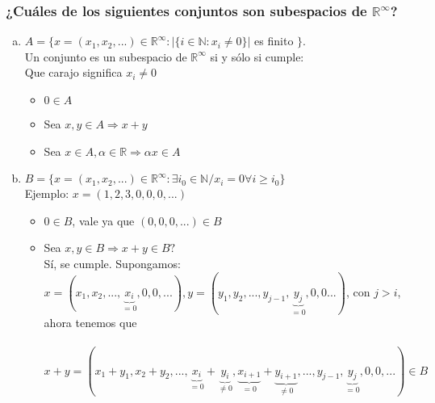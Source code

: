 \documentclass{article}
\begin{document}
\subsubsection{¿Cuáles de los siguientes conjuntos son subespacios de $\mathbb{R}^\infty$?}
\begin{enumerate}[a.]
\item
	$A = \lbrace x = (x_1,x_2,...) \in \mathbb{R}^\infty : | \lbrace i \in \mathbb{N} : x_i \not = 0 \rbrace| $ es finito $ \rbrace.$ \\
	Un conjunto es un subespacio de $\mathbb{R}^\infty$ si y sólo si cumple: \\
	Que carajo significa $x_i \not = 0$
	\begin{itemize}
		\item $0 \in A$
		\item Sea $x,y \in A \Rightarrow x+y$
		\item Sea $x \in A, \alpha \in \mathbb{R} \Rightarrow \alpha x \in A$
	\end{itemize}
\item
	$B = \lbrace x = (x_1,x_2,...) \in \mathbb{R}^\infty : \exists i_0 \in \mathbb{N} / x_i = 0 \forall i \geq i_0 \rbrace$ \\
	Ejemplo: $x = (1,2,3,0,0,0,...)$
	\begin{itemize}
		\item $0 \in B$, vale ya que $(0,0,0,...) \in B$
		\item 
			Sea $x,y \in B \Rightarrow x+y \in B?$ \\
			Sí, se cumple. Supongamos: \\
			$x = (x_1,x_2,...,\underbrace{x_i}_{=0},0,0,...), y = (y_1,y_2,...,y_{j-1},\underbrace{y_j}_{=0},0,0...)$, con $j>i$, ahora tenemos que \\ \\
			$x + y = (x_1+y_1,x_2+y_2,...,\underbrace{x_i}_{=0}+\underbrace{y_i}_{\not = 0},\underbrace{x_{i+1}}_{=0}+\underbrace{y_{i+1}}_{\not = 0},...,y_{j-1},\underbrace{y_j}_{=0},0,0,...) \in B$ \\


\end{itemize}
\end{enumerate}
\end{document}
